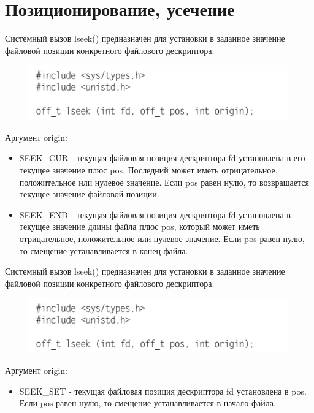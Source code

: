 \documentclass{beamer}
\begin{document}
\section{Позиционирование, усечение}
\begin{frame}
Системный вызов lseek() предназначен для установки в заданное значение файловой позиции конкретного файлового дескриптора. 
\begin{figure}[h]
\centering
\includegraphics[scale=0.6]{images/lec06-pic19.png}
\end{figure}
Аргумент origin:
\begin{itemize}
\item SEEK\_CUR - текущая файловая позиция дескриптора fd установлена в его текущее
значение плюс pos. Последний может иметь отрицательное, положительное или
нулевое значение. Если pos равен нулю, то возвращается текущее значение
файловой позиции.
\item SEEK\_END - текущая файловая позиция дескриптора fd установлена в текущее
значение длины файла плюс pos, который может иметь отрицательное, положительное или нулевое значение. Если pos равен нулю, то смещение устанавливается в конец файла.
\end{itemize}
\end{frame}

\begin{frame}
Системный вызов lseek() предназначен для установки в заданное значение файловой позиции конкретного файлового дескриптора. 
\begin{figure}[h]
\centering
\includegraphics[scale=0.6]{images/lec06-pic19.png}
\end{figure}
Аргумент origin:
\begin{itemize}
\item SEEK\_SET - текущая файловая позиция дескриптора fd установлена в pos. Если
pos равен нулю, то смещение устанавливается в начало файла. 
\end{itemize}
\end{frame}
\end{document}
